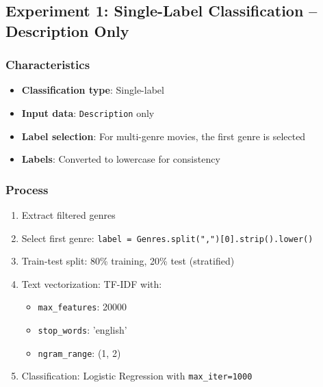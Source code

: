 \documentclass[12pt,a4paper]{article}
\begin{document}
\subsection{Experiment 1: Single-Label Classification -- Description Only}

\subsubsection{Characteristics}

\begin{itemize}

    \item \textbf{Classification type}: Single-label

    \item \textbf{Input data}: \texttt{Description} only

    \item \textbf{Label selection}: For multi-genre movies, the first genre is selected

    \item \textbf{Labels}: Converted to lowercase for consistency

\end{itemize}

\subsubsection{Process}

\begin{enumerate}

    \item Extract filtered genres

    \item Select first genre: \texttt{label = Genres.split(",")[0].strip().lower()}

    \item Train-test split: 80\% training, 20\% test (stratified)

    \item Text vectorization: TF-IDF with:

    \begin{itemize}

        \item \texttt{max\_features}: 20000

        \item \texttt{stop\_words}: 'english'

        \item \texttt{ngram\_range}: (1, 2)

    \end{itemize}

    \item Classification: Logistic Regression with \texttt{max\_iter=1000}

\end{enumerate}
\end{document}
